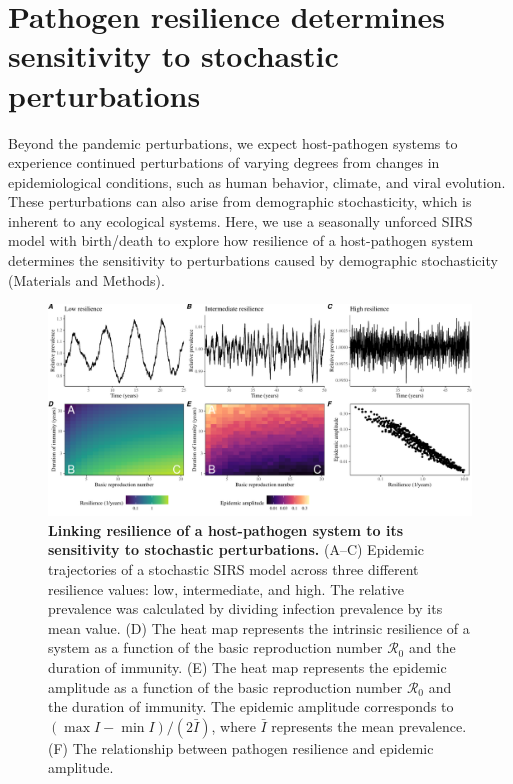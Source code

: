 \documentclass[12pt]{article}
\begin{document}
\section*{Pathogen resilience determines sensitivity to stochastic perturbations}

Beyond the pandemic perturbations, we expect host-pathogen systems to experience continued perturbations of varying degrees from changes in epidemiological conditions, such as human behavior, climate, and viral evolution.
These perturbations can also arise from demographic stochasticity, which is inherent to any ecological systems.
Here, we use a seasonally unforced SIRS model with birth/death to explore how resilience of a host-pathogen system determines the sensitivity to perturbations caused by demographic stochasticity (Materials and Methods).

\begin{figure}[!th]
\begin{center}
\includegraphics[width=\textwidth]{../figure6/figure_persistence_noise.pdf}
\caption{
\textbf{Linking resilience of a host-pathogen system to its sensitivity to stochastic perturbations.}
(A--C) Epidemic trajectories of a stochastic SIRS model across three different resilience values: low, intermediate, and high.
The relative prevalence was calculated by dividing infection prevalence by its mean value.
(D) The heat map represents the intrinsic resilience of a system as a function of the basic reproduction number $\mathcal R_0$ and the duration of immunity.
(E) The heat map represents the epidemic amplitude as a function of the basic reproduction number $\mathcal R_0$ and the duration of immunity.
The epidemic amplitude corresponds to $(\max I - \min I)/(2 \bar{I})$, where $\bar{I}$ represents the mean prevalence.
(F) The relationship between pathogen resilience and epidemic amplitude.
}
\end{center}
\end{figure}
\end{document}
